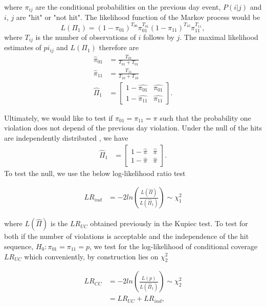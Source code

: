 \documentclass[a4paper,11pt]{article}
\begin{document}
\begin{flushleft}
\begin{itemize}
where $\pi_{ij}$ are the conditional probabilities on the previous day event, $P\left(i|j\right)$ and $i$, $j$ are "hit" or "not hit". The likelihood function of the Markov process would be 
 \begin{equation*}
 L \left(\Pi_1\right) =  \left(1-\pi_{01}\right)^{T_{00}}  \pi_{01}^{T_{01}} \left(1-\pi_{11}\right)^{T_{10}}  \pi_{11}^{T_{11}},
 \end{equation*}
where $T_{ij}$ is the number of observations of $i$ follows by $j$. The maximal likelihood estimates of $pi_{ij}$ and $L\left( \Pi_1 \right)$ therefore are 
\begin{align*}
\hat{\pi}_{01} &= \frac{T_{01}}{T_{01}+T_{01}}\\
\hat{\pi}_{11} &= \frac{T_{11}}{T_{10}+T_{10}}\\
\hat{\Pi}_1 &= \begin{bmatrix} {1-\hat{\pi_{01}}} & \hat{\pi_{01}} \\
  {1-\hat{\pi_{11}}} & \hat{\pi_{11}}  \end{bmatrix}.
\end{align*}

Ultimately, we would like to test if $\pi_{01} = \pi_{11} = \pi$ such that the probability one violation does not depend of the previous day violation. Under the null of the hits are independently distributed , we have
\begin{align*}
 \hat{\Pi}_1 &= \begin{bmatrix} {1-\hat{\pi}} & \hat{\pi} \\
  {1-\hat{\pi}} & \hat{\pi}  \end{bmatrix}.
\end{align*}
To test the null, we use the below log-likelihood ratio test

\begin{align*}
LR_{ind} &=  -2 ln \left(\frac{L\left(\hat{\Pi}\right)}{L\left(\hat{\Pi}_1\right)}\right) \sim \chi^2_1
\end{align*}

where $L\left(\hat{\Pi}\right)$ is the $LR_{UC}$ obtained previously in the Kupiec test. To test for both if the number of violations is acceptable and the independence of the hit sequence, $H_0: \pi_{01} = \pi_{11} = p$, we test for the log-likelihood of conditional coverage $LR_{UC}$ which conveniently, by construction lies on $\chi^2_2$

\begin{align*}
LR_{CC} &= -2 ln \left(\frac{L\left( p \right)}{L\left(\hat{\Pi}_1\right)}\right) \sim \chi^2_2 \\
&= LR_{UC} + LR_{ind},
\end{align*}


\end{itemize}
\end{flushleft}
\end{document}
